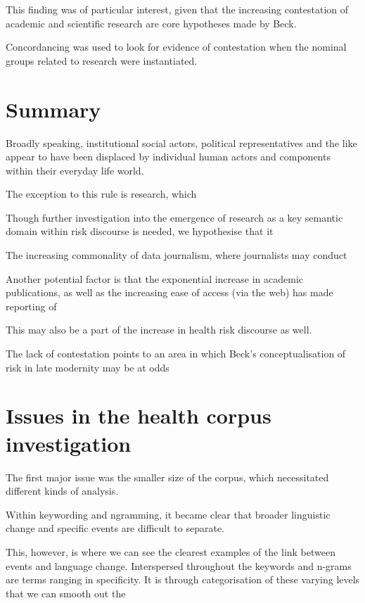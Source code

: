 This finding was of particular interest, given that the increasing contestation of academic and scientific research are core hypotheses made by Beck.

Concordancing was used to look for evidence of contestation when the nominal groups related to research were instantiated.



\section{Summary}

Broadly speaking, institutional social actors, political representatives and the like appear to have been displaced by individual human actors and components within their everyday life world.

The exception to this rule is research, which

Though further investigation into the emergence of research as a key semantic domain within risk discourse is needed, we hypothesise that it

The increasing commonality of data journalism, where journalists may conduct

Another potential factor is that the exponential increase in academic publications, as well as the increasing ease of access (via the web) has made reporting of 

This may also be a part of the increase in health risk discourse as well.

The lack of contestation points to an area in which Beck's conceptualisation of risk in late modernity may be at odds




\section{Issues in the health corpus investigation}

The first major issue was the smaller size of the corpus, which necessitated different kinds of analysis.

Within keywording and ngramming, it became clear that broader linguistic change and specific events are difficult to separate.

This, however, is where we can see the clearest examples of the link between events and language change. Interspersed throughout the keywords and n-grams are terms ranging in specificity. It is through categorisation of these varying levels that we can smooth out the 


